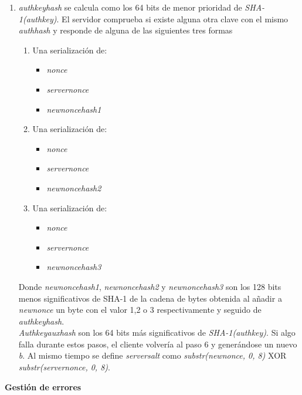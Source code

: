 \begin{enumerate}
	\item \emph{auth\textunderscore key\textunderscore hash} se calcula como los 64 bits de menor prioridad de \emph{SHA-1(auth\textunderscore key)}. El servidor comprueba si existe alguna otra clave con el mismo \emph{auth\textunderscore hash} y responde de alguna de las siguientes tres formas
	\begin{enumerate}
		\item Una serialización de: 
			\begin{itemize}
				\item \emph{nonce}
				\item \emph{server\textunderscore nonce}
				\item \emph{new\textunderscore nonce\textunderscore hash1}
			\end{itemize}
		\item Una serialización de:
			\begin{itemize}
				\item \emph{nonce}	
				\item \emph{server\textunderscore nonce}
				\item \emph{new\textunderscore nonce\textunderscore hash2}
			\end{itemize}
		\item Una serialización de:
			\begin{itemize}
				\item \emph{nonce}	
				\item \emph{server\textunderscore nonce}
				\item \emph{new\textunderscore nonce\textunderscore hash3}
			\end{itemize}
	\end{enumerate}
	Donde \emph{new\textunderscore nonce\textunderscore hash1}, \emph{new\textunderscore nonce\textunderscore hash2} y \emph{new\textunderscore nonce\textunderscore hash3} son los 128 bits menos significativos de SHA-1 de la cadena de bytes obtenida al añadir a \emph{new\textunderscore nonce} un byte con el valor 1,2 o 3 respectivamente y seguido de \emph{auth\textunderscore key\textunderscore hash}.\\
	\emph{Auth\textunderscore key\textunderscore aux\textunderscore hash} son los 64 bits más significativos de \emph{SHA-1(auth\textunderscore key)}.
	Si algo falla durante estos pasos, el cliente volvería al paso 6 y generándose un nuevo \emph{b}. Al mismo tiempo se define \emph{server\textunderscore salt} como \emph{substr(new\textunderscore nonce, 0, 8)} XOR \emph{substr(server\textunderscore nonce, 0, 8)}.\\
	
\end{enumerate}
\textbf{Gestión de errores}

